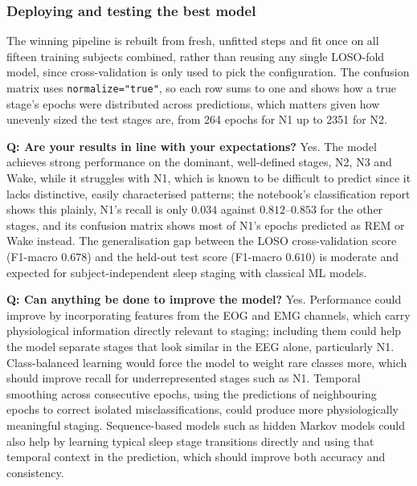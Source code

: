 \documentclass[11pt,a4paper]{article}
\begin{document}
\subsubsection{Deploying and testing the best model}


The winning pipeline is rebuilt from fresh, unfitted steps and fit once on all fifteen training subjects combined, rather than reusing any single LOSO-fold model, since cross-validation is only used to pick the configuration. The confusion matrix uses \texttt{normalize="true"}, so each row sums to one and shows how a true stage's epochs were distributed across predictions, which matters given how unevenly sized the test stages are, from 264 epochs for N1 up to 2351 for N2.


\textbf{Q: Are your results in line with your expectations?} Yes. The model achieves strong
performance on the dominant, well-defined stages, N2, N3 and Wake, while it struggles with N1,
which is known to be difficult to predict since it lacks distinctive, easily characterised
patterns; the notebook's classification report shows this plainly, N1's recall is only $0.034$
against $0.812$--$0.853$ for the other stages, and its confusion matrix shows most of N1's
epochs predicted as REM or Wake instead. The generalisation gap between the LOSO cross-validation
score (F1-macro $0.678$) and the held-out test score (F1-macro $0.610$) is moderate and expected
for subject-independent sleep staging with classical ML models.

\textbf{Q: Can anything be done to improve the model?} Yes. Performance could improve by
incorporating features from the EOG and EMG channels, which carry physiological information
directly relevant to staging; including them could help the model separate stages that look
similar in the EEG alone, particularly N1. Class-balanced learning would force the model to
weight rare classes more, which should improve recall for underrepresented stages such as N1.
Temporal smoothing across consecutive epochs, using the predictions of neighbouring epochs to
correct isolated misclassifications, could produce more physiologically meaningful staging.
Sequence-based models such as hidden Markov models could also help by learning typical sleep
stage transitions directly and using that temporal context in the prediction, which should
improve both accuracy and consistency.
\end{document}
